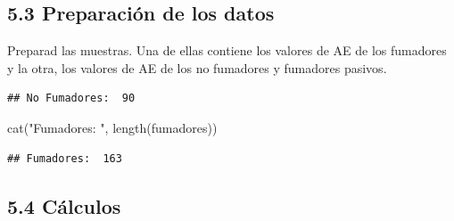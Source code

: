 \documentclass[
]{article}
\newenvironment{Shaded}{\begin{snugshade}}{\end{snugshade}}
\newcommand{\FunctionTok}[1]{\textcolor[rgb]{0.00,0.00,0.00}{#1}}
\newcommand{\NormalTok}[1]{#1}
\newcommand{\OtherTok}[1]{\textcolor[rgb]{0.56,0.35,0.01}{#1}}
\newcommand{\SpecialCharTok}[1]{\textcolor[rgb]{0.00,0.00,0.00}{#1}}
\newcommand{\StringTok}[1]{\textcolor[rgb]{0.31,0.60,0.02}{#1}}
\begin{document}
\vspace{0.3cm}

\hypertarget{preparaciuxf3n-de-los-datos}{%
\subsection{5.3 Preparación de los
datos}\label{preparaciuxf3n-de-los-datos}}

Preparad las muestras. Una de ellas contiene los valores de AE de los
fumadores y la otra, los valores de AE de los no fumadores y fumadores
pasivos.

\vspace{0.3cm}

\begin{Shaded}
\end{Shaded}

\begin{verbatim}
## No Fumadores:  90
\end{verbatim}

\begin{Shaded}
\begin{Highlighting}[]
\FunctionTok{cat}\NormalTok{(}\StringTok{"Fumadores: "}\NormalTok{, }\FunctionTok{length}\NormalTok{(fumadores))}
\end{Highlighting}
\end{Shaded}

\begin{verbatim}
## Fumadores:  163
\end{verbatim}

\newpage

\hypertarget{cuxe1lculos-2}{%
\subsection{5.4 Cálculos}\label{cuxe1lculos-2}}
\end{document}
